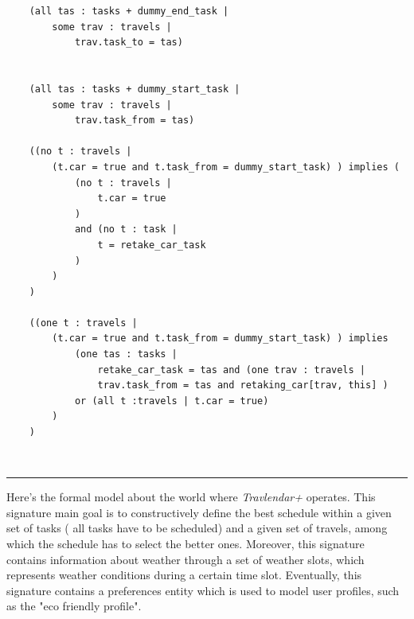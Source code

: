 \begin{verbatim}
    (all tas : tasks + dummy_end_task |
        some trav : travels |
            trav.task_to = tas)
            
            
    (all tas : tasks + dummy_start_task |
        some trav : travels | 
            trav.task_from = tas)
            
    ((no t : travels | 
        (t.car = true and t.task_from = dummy_start_task) ) implies ( 
            (no t : travels |
                t.car = true 
            ) 
            and (no t : task |
                t = retake_car_task
            )
        )
    )
    
    ((one t : travels | 
        (t.car = true and t.task_from = dummy_start_task) ) implies
            (one tas : tasks | 
                retake_car_task = tas and (one trav : travels | 
                trav.task_from = tas and retaking_car[trav, this] ) 
            or (all t :travels | t.car = true)
        )
    )
\end{verbatim}
\\
\rule{\textwidth}{0.4pt}
Here's the formal model about the world where \emph{Travlendar+} operates. This signature main goal is to constructively define the best schedule within a given set of tasks ( all tasks have to be scheduled) and a given set of travels, among which the schedule has to select the better ones. Moreover, this signature contains information about weather through a set of weather slots, which represents weather conditions during a certain time slot. Eventually, this signature contains a preferences entity which is used to model user profiles, such as the "eco friendly profile". 
